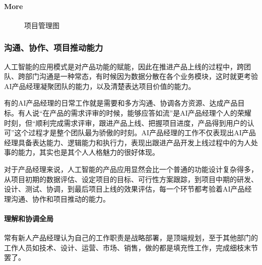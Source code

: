 \documentclass[letterpaper,10pt,english]{sphinxmanual}
\begin{document}
\paragraph{More}
\label{\detokenize{chapter_knowledge/project_manage:more}}
\begin{figure}[H]
\centering
\capstart

\noindent{}
\caption{项目管理图}\label{\detokenize{chapter_knowledge/project_manage:id24}}\end{figure}


\subsubsection{沟通、协作、项目推动能力}
\label{\detokenize{chapter_knowledge/collaborate:id1}}\label{\detokenize{chapter_knowledge/collaborate::doc}}
人工智能的应用模式是对产品功能的赋能，因此在推进产品上线的过程中，跨团队、跨部门沟通是一种常态，有时候因为数据分散在各个业务模块，这时就更考验AI产品经理凝聚团队的能力，以及清楚表达项目价值的能力。

有的AI产品经理的日常工作就是需要和多方沟通、协调各方资源、达成产品目标。有人说“在产品的需求评审的时候，能够应答如流”是AI产品经理个人的荣耀时刻，但“顺利完成需求评审，跟进产品上线、把握项目进度，产品得到用户的认可”这个过程才是整个团队最为骄傲的时刻。AI产品经理的工作不仅表现出AI产品经理具备表达能力、逻辑能力和执行力，表现出跟进产品开发上线过程中的为人处事的能力，其实也是其个人人格魅力的很好体现。

对于产品经理来说，人工智能的产品应用显然会比一个普通的功能设计复杂得多，从项目初期的数据评估、设定项目的目标、可行性方案跟踪，到项目中期的研发、设计、测试、协调，到最后项目上线的效果评估，每一个环节都考验着AI产品经理沟通、协作和项目推动的能力。%
\begin{footnote}[660]\sphinxAtStartFootnote
{}
%
\end{footnote}


\paragraph{理解和协调全局}
\label{\detokenize{chapter_knowledge/collaborate:id2}}
常有新人产品经理认为自己的工作职责是战略部署，是顶端规划，至于其他部门的工作人员如技术、设计、运营、市场、销售，做的都是填充性工作，完成细枝末节罢了。
\end{document}
